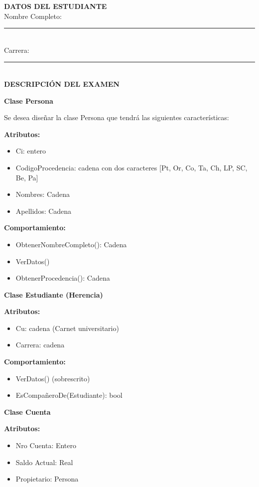 \documentclass[8pt]{article}
\begin{document}
\begin{multicols}{2}

\textbf{DATOS DEL ESTUDIANTE}\\
Nombre Completo: \rule{4cm}{0.5pt}\\
Carrera: \rule{4cm}{0.5pt}\\[2pt]

\textbf{DESCRIPCIÓN DEL EXAMEN}

\textbf{Clase Persona}

Se desea diseñar la clase Persona que tendrá las siguientes características:

\textbf{Atributos:}
\begin{itemize}[leftmargin=10pt, itemsep=0pt]
    \item Ci: entero
    \item CodigoProcedencia: cadena con dos caracteres [Pt, Or, Co, Ta, Ch, LP, SC, Be, Pa]
    \item Nombres: Cadena
    \item Apellidos: Cadena
\end{itemize}

\textbf{Comportamiento:}
\begin{itemize}[leftmargin=10pt, itemsep=0pt]
    \item ObtenerNombreCompleto(): Cadena
    \item VerDatos()
    \item ObtenerProcedencia(): Cadena
\end{itemize}

\textbf{Clase Estudiante (Herencia)}

\textbf{Atributos:}
\begin{itemize}[leftmargin=10pt, itemsep=0pt]
    \item Cu: cadena (Carnet universitario)
    \item Carrera: cadena
\end{itemize}

\textbf{Comportamiento:}
\begin{itemize}[leftmargin=10pt, itemsep=0pt]
    \item VerDatos() (sobrescrito)
    \item EsCompañeroDe(Estudiante): bool
\end{itemize}

\textbf{Clase Cuenta}

\textbf{Atributos:}
\begin{itemize}[leftmargin=10pt, itemsep=0pt]
    \item Nro Cuenta: Entero
    \item Saldo Actual: Real
    \item Propietario: Persona
\end{itemize}


\end{multicols}
\end{document}
